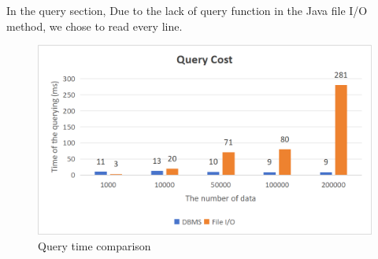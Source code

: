 \documentclass{article}
\begin{document}
 In the query section, Due to the lack of query function in the Java file I/O
method, we chose to read every line.
\begin{figure}[h]
\centering %
\includegraphics[width=.8\textwidth]{query.png} %
\caption{Query time comparison} %
\label{fig:引用标签} %
\end{figure}
\newpage
\end{document}
